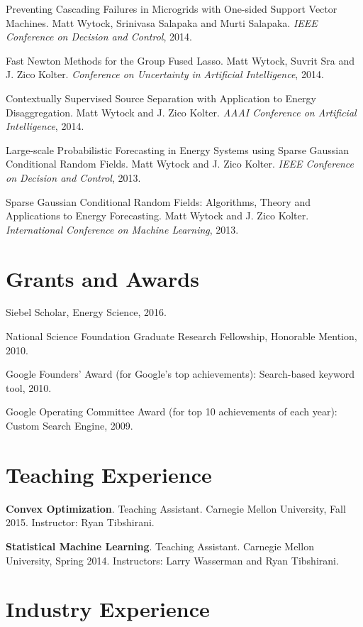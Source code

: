 \documentclass[margin, line]{res}
\begin{document}
\begin{resume}
Preventing Cascading Failures in Microgrids with One-sided Support Vector
Machines. Matt Wytock, Srinivasa Salapaka and Murti Salapaka. \emph{IEEE
Conference on Decision and Control}, 2014.

Fast Newton Methods for the Group Fused Lasso. Matt Wytock, Suvrit Sra and
J. Zico Kolter. \emph{Conference on Uncertainty in Artificial Intelligence}, 2014.

Contextually Supervised Source Separation with Application to Energy
Disaggregation. Matt Wytock and J. Zico Kolter. \emph{AAAI Conference on Artificial
Intelligence}, 2014.

Large-scale Probabilistic Forecasting in Energy Systems using Sparse Gaussian
Conditional Random Fields. Matt Wytock and J. Zico Kolter. \emph{IEEE Conference
on Decision and Control}, 2013.

Sparse Gaussian Conditional Random Fields: Algorithms, Theory and Applications
to Energy Forecasting. Matt Wytock and J. Zico Kolter. \emph{International Conference
on Machine Learning}, 2013.

\section{Grants and Awards}

Siebel Scholar, Energy Science, 2016.

National Science Foundation Graduate Research Fellowship, Honorable Mention,
2010.

Google Founders' Award (for Google's top achievements): Search-based keyword
tool, 2010.

Google Operating Committee Award (for top 10 achievements of each year): Custom Search Engine, 2009.

\section{Teaching Experience}

{\bf Convex Optimization}. Teaching Assistant. Carnegie Mellon University, Fall
2015. Instructor: Ryan Tibshirani.

{\bf Statistical Machine Learning}. Teaching Assistant. Carnegie Mellon
University, Spring 2014. Instructors: Larry Wasserman and Ryan Tibshirani.

\section{Industry Experience}


\end{resume}
\end{document}
